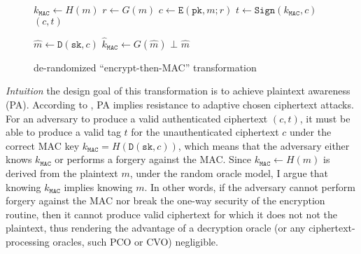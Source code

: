 \documentclass{article}
\newcommand{\monospace}{\texttt}
\newcommand{\encrypt}{\monospace{E}}
\newcommand{\decrypt}{\monospace{D}}
\newcommand{\etm}{\monospace{EtM}}  %
\newcommand{\mac}{\monospace{MAC}}
\newcommand{\sign}{\monospace{Sign}}
\newcommand{\verify}{\monospace{Verify}}
\newcommand{\pk}{\monospace{pk}}
\newcommand{\sk}{\monospace{sk}}
\newlength{\wdth}
\newcommand{\strike}[1]{\settowidth{\wdth}{#1}\rlap{\rule[.5ex]{\wdth}{.4pt}}#1}
\newcommand{\notrand}{{\strike{\$}}}
\begin{document}
\begin{figure}[H]
  \begin{minipage}{0.49\textwidth}  %
    \begin{algorithm}[H]
      \caption{$\encrypt^\notrand_\etm(\pk, m)$}
      \begin{algorithmic}[1]
        \State $k_\mac \leftarrow H(m)$
        \State $r \leftarrow G(m)$
        \State $c \leftarrow \encrypt(\pk, m; r)$
        \State $t \leftarrow \sign(k_\mac, c)$
        \State \Return $(c, t)$
      \end{algorithmic}
    \end{algorithm}
  \end{minipage}
  \hfill  %
  \begin{minipage}{.49\textwidth}  %
    \begin{algorithm}[H]
      \caption{$\decrypt^\notrand_\etm(\sk, (c, t))$}
      \begin{algorithmic}[1]
        \State $\hat{m} \leftarrow \decrypt(\sk, c)$
        \State $\hat{k}_\mac \leftarrow G(\hat{m})$
        \If{$\verify(\hat{k}_\mac, c, t) \neq 1$}
          \State \Return $\bot$
        \EndIf
        \State \Return $\hat{m}$
      \end{algorithmic}
    \end{algorithm}
  \end{minipage}
  \caption{
    de-randomized ``encrypt-then-MAC'' transformation
  }\label{fig:derand-etm}
\end{figure}

\emph{Intuition} the design goal of this transformation is to achieve plaintext awareness (PA). According to \cite{bellare1998relations}, PA implies resistance to adaptive chosen ciphertext attacks. For an adversary to produce a valid authenticated ciphertext $(c, t)$, it must be able to produce a valid tag $t$ for the unauthenticated ciphertext $c$ under the correct MAC key $k_\mac = H(\decrypt(\sk, c))$, which means that the adversary either knows $k_\mac$ or performs a forgery against the MAC. Since $k_\mac \leftarrow H(m)$ is derived from the plaintext $m$, under the random oracle model, I argue that knowing $k_\mac$ implies knowing $m$. In other words, if the adversary cannot perform forgery against the MAC nor break the one-way security of the encryption routine, then it cannot produce valid ciphertext for which it does not not the plaintext, thus rendering the advantage of a decryption oracle (or any ciphertext-processing oracles, such PCO or CVO) negligible.
\end{document}
